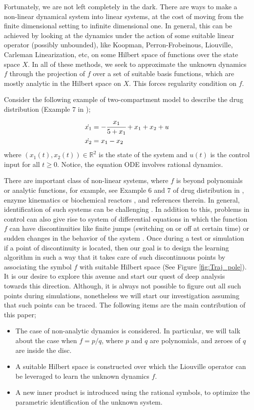 \documentclass[preprint,12pt]{elsarticle} %
\theoremstyle{plain}
\theoremstyle{definition}
\theoremstyle{remark}
\begin{document}
Fortunately, we are not left completely in the dark. There are ways to make a non-linear dynamical system into linear systems, at the cost of moving from the finite dimensional setting to infinite dimensional one. In general, this can be achieved by looking at the dynamics under the action of some suitable linear operator (possibly unbounded), like Koopman, Perron-Frobeinous, Liouville, Carleman Linearization, etc, on some Hilbert space of functions over the state space $X$. In all of these methods, we seek to approximate the unknown dynamics $f$ through the projection of $f$ over a set of suitable basis functions, which are mostly analytic in the Hilbert space on $X$. This forces regularity condition on $f$. 

Consider the following example of two-compartment model to describe the drug distribution (Example 7 in \cite{strasser2021data});
\begin{align*}
    \dot{x_1} &= -\cfrac{x_1}{5+x_1}+x_1 +x_2+u\\
    \dot{x_2} &= x_1 - x_2
\end{align*}
where $(x_1(t),x_2(t))\in \mathbb{R}^2$ is the state of the system and $u(t)$ is the control input for all $t\geq 0$. Notice, the equation ODE involves rational dynamics. 

There are important class of non-linear systems, where $f$ is beyond polynomials or analytic functions, for example, see Example 6 and 7 of drug distribution in \cite{strasser2021data}, enzyme kinematics \cite{holmberg1982practical} or biochemical reactors \cite{strogatz2024nonlinear}, and references therein. In general, identification of such systems can be challenging \cite{evans2002identifiability}. In addition to this,  problems in control can also give rise to system of differential equations in which the function $f$ can have discontinuities like finite jumps (switching on or off at certain time) or sudden changes in the behavior of the system \cite{chappell1990global}. Once during a test or simulation if a point of discontinuity is located, then our goal is to design the learning algorithm in such a way that it takes care of such discontinuous points by associating the symbol $f$ with suitable Hilbert space (See Figure \ref{fig:Traj_pole}). It is our desire to explore this avenue and start our quest of deep analysis towards this direction. Although, it is always not possible to figure out all such points during simulations, nonetheless we will start our investigation assuming that such points can be traced. The following items are the main contribution of this paper;
\begin{itemize}
    \item The case of non-analytic dynamics is considered. In particular, we will talk about the case when $f=p/q$, where $p$ and $q$ are polynomials, and zeroes of $q$ are inside the disc.
    \item A suitable Hilbert space is constructed over which the Liouville operator can be leveraged to learn the unknown dynamics $f$.
    \item A new inner product is introduced using the rational symbols, to optimize the parametric identification of the unknown system.
\end{itemize}
\end{document}
